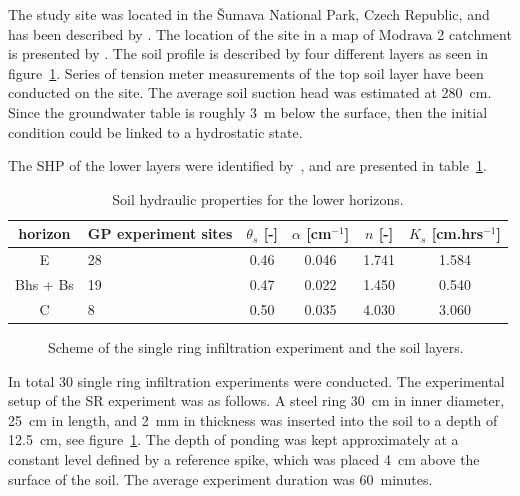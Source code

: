\documentclass[review,times,3p,10pt]{elsarticle}
\newcommand{\fs}{\footnotesize}
\begin{document}
{The study site was located in the \v{S}umava National Park, {Czech Republic}, and has been described by \cite{Jacka1}. The location of the site in a map of Modrava 2 catchment is presented by \cite{Jacka2}.
The soil profile is described by four different layers as seen in figure~\ref{experiment}. 
{Series  of tension meter measurements of the top soil layer have been conducted on the site. The average soil suction head was estimated at 280~cm. Since the groundwater table is roughly 3~m below the surface, then the initial condition could be linked to a hydrostatic state.    }





{The SHP of the lower layers were identified by~\cite{Jacka1}, and are presented in table~\ref{tab_SHP}. }






 




\begin{table}[ht]
\begin{center}
\caption{Soil hydraulic properties for the lower horizons.}
\fs
\begin{tabular}{c | p{2cm} | c c c c }
\toprule
horizon &  GP experiment sites  & $\theta_s$ [-] & $\alpha$ [cm$^{-1}$]& $n$ [-]& $K_s$ [cm.hrs$^{-1}$]  \\ \hline
E & 28 &  0.46 & 0.046 & 1.741 & 1.584 \\
Bhs + Bs & 19  &0.47&  0.022 & 1.450 & 0.540 \\
C & 8 & 0.50 & 0.035 & 4.030 &  3.060  \\
\toprule
\end{tabular}
\label{tab_SHP}
\end{center}
\end{table}




 


 \begin{figure}
\centering
{}
 \caption{Scheme of the single ring infiltration experiment and the soil layers. }
 \label{experiment}
\end{figure}


In total 30 single ring infiltration experiments were conducted.
The experimental setup of the SR experiment was as follows. A steel ring 30~cm in inner diameter, 25~cm in length, and 2~mm in thickness was inserted into the soil to a depth of 12.5~cm, see figure~\ref{experiment}. The depth of ponding was kept approximately at a constant level defined by a reference spike, which was placed 4~cm above the surface of the soil. The average experiment duration was 60~minutes.


}
\end{document}
